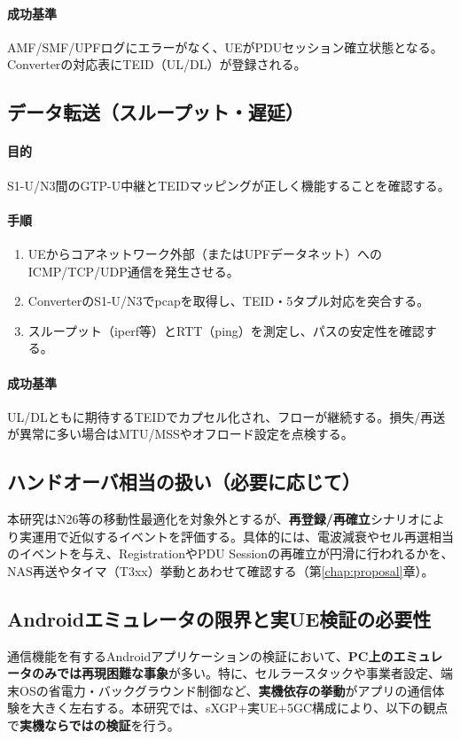 \paragraph{成功基準} AMF/SMF/UPFログにエラーがなく、UEがPDUセッション確立状態となる。Converterの対応表にTEID（UL/DL）が登録される。

\subsection{データ転送（スループット・遅延）}
\paragraph{目的} S1-U/N3間のGTP-U中継とTEIDマッピングが正しく機能することを確認する。
\paragraph{手順}
\begin{enumerate}
	\item UEからコアネットワーク外部（またはUPFデータネット）へのICMP/TCP/UDP通信を発生させる。
	\item ConverterのS1-U/N3でpcapを取得し、TEID・5タプル対応を突合する。
	\item スループット（iperf等）とRTT（ping）を測定し、パスの安定性を確認する。
\end{enumerate}
\paragraph{成功基準} UL/DLともに期待するTEIDでカプセル化され、フローが継続する。損失/再送が異常に多い場合はMTU/MSSやオフロード設定を点検する。

\subsection{ハンドオーバ相当の扱い（必要に応じて）}
本研究はN26等の移動性最適化を対象外とするが、\textbf{再登録/再確立}シナリオにより実運用で近似するイベントを評価する。具体的には、電波減衰やセル再選相当のイベントを与え、RegistrationやPDU Sessionの再確立が円滑に行われるかを、NAS再送やタイマ（T3xx）挙動とあわせて確認する（第\ref{chap:proposal}章）。

\subsection{Androidエミュレータの限界と実UE検証の必要性}
通信機能を有するAndroidアプリケーションの検証において、\textbf{PC上のエミュレータのみでは再現困難な事象}が多い。特に、セルラースタックや事業者設定、端末OSの省電力・バックグラウンド制御など、\textbf{実機依存の挙動}がアプリの通信体験を大きく左右する。本研究では、sXGP+実UE+5GC構成により、以下の観点で\textbf{実機ならではの検証}を行う。

